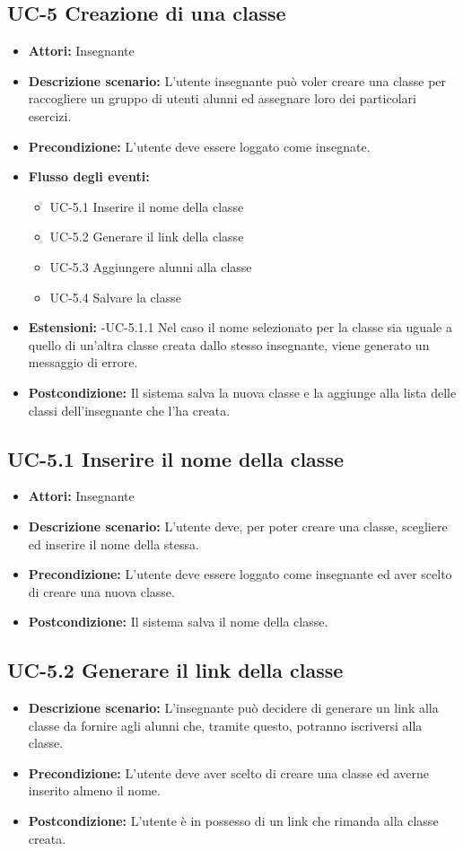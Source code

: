 \subsection{UC-5 Creazione di una classe}
\begin{itemize}
	\item \textbf{Attori:} Insegnante
	\item \textbf{Descrizione scenario:} L'utente insegnante può voler creare una classe per raccogliere un gruppo di utenti alunni ed assegnare loro dei particolari esercizi.
	\item \textbf{Precondizione:} L'utente deve essere loggato come insegnate.
	\item \textbf{Flusso degli eventi:}
	\begin{itemize}
		\item UC-5.1 Inserire il nome della classe
		\item UC-5.2 Generare il link della classe
		\item UC-5.3 Aggiungere alunni alla classe
		\item UC-5.4 Salvare la classe
	\end{itemize}
	\item \textbf{Estensioni:}
	-UC-5.1.1 Nel caso il nome selezionato per la classe sia uguale a quello di un'altra classe creata dallo stesso insegnante, viene generato un messaggio di errore.
	\item \textbf{Postcondizione:} Il sistema salva la nuova classe e la aggiunge alla lista delle classi dell'insegnante che l'ha creata.
\end{itemize}
\subsection{UC-5.1 Inserire il nome della classe}
\begin{itemize}
	\item \textbf{Attori:} Insegnante
	\item \textbf{Descrizione scenario:} L'utente deve, per poter creare una classe, scegliere ed inserire il nome della stessa.
	\item \textbf{Precondizione:} L'utente deve essere loggato come insegnante ed aver scelto di creare una nuova classe.
	\item \textbf{Postcondizione:} Il sistema salva il nome della classe.
\end{itemize}
\subsection{UC-5.2 Generare il link della classe}
\begin{itemize}
	\item \textbf{Descrizione scenario:} L'insegnante può decidere di generare un link alla classe da fornire agli alunni che, tramite questo, potranno iscriversi alla classe.
	\item \textbf{Precondizione:} L'utente deve aver scelto di creare una classe ed averne inserito almeno il nome.
	\item \textbf{Postcondizione:} L'utente è in possesso di un link che rimanda alla classe creata.
\end{itemize}
